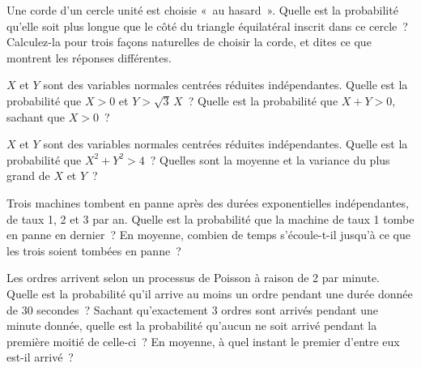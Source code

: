 \begin{question}\label{iq:iv1:continuous-and-geometric-probability:11}
Une corde d'un cercle unité est choisie «~au hasard~». Quelle est la probabilité qu'elle soit plus longue que le côté du triangle équilatéral inscrit dans ce cercle~? Calculez-la pour trois façons naturelles de choisir la corde, et dites ce que montrent les réponses différentes.
\end{question}

\begin{question}\label{iq:iv1:continuous-and-geometric-probability:12}
$X$ et $Y$ sont des variables normales centrées réduites indépendantes. Quelle est la probabilité que $X > 0$ et $Y > \sqrt{3}\,X$~? Quelle est la probabilité que $X + Y > 0$, sachant que $X > 0$~?
\end{question}

\begin{question}\label{iq:iv1:continuous-and-geometric-probability:13}
$X$ et $Y$ sont des variables normales centrées réduites indépendantes. Quelle est la probabilité que $X^2 + Y^2 > 4$~? Quelles sont la moyenne et la variance du plus grand de $X$ et $Y$~?
\end{question}

\begin{question}\label{iq:iv1:continuous-and-geometric-probability:14}
Trois machines tombent en panne après des durées exponentielles indépendantes, de taux 1, 2 et 3 par an. Quelle est la probabilité que la machine de taux 1 tombe en panne en dernier~? En moyenne, combien de temps s'écoule-t-il jusqu'à ce que les trois soient tombées en panne~?
\end{question}

\begin{question}\label{iq:iv1:continuous-and-geometric-probability:15}
Les ordres arrivent selon un processus de Poisson à raison de 2 par minute. Quelle est la probabilité qu'il arrive au moins un ordre pendant une durée donnée de 30 secondes~? Sachant qu'exactement 3 ordres sont arrivés pendant une minute donnée, quelle est la probabilité qu'aucun ne soit arrivé pendant la première moitié de celle-ci~? En moyenne, à quel instant le premier d'entre eux est-il arrivé~?
\end{question}

